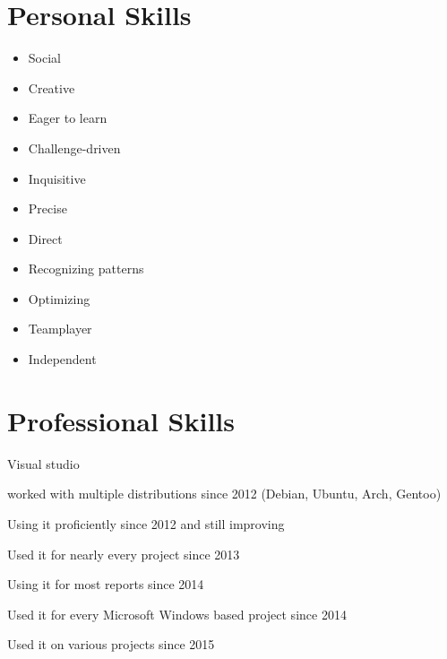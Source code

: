 \documentclass[]{friggeri-cv} %
\begin{document}

\section{Personal Skills}

\begin{multicols}{2}
   \begin{itemize}
      \item Social
      \item Creative
      \item Eager to learn
      \item Challenge-driven
      \item Inquisitive
      \item Precise
      \item Direct
      \item Recognizing patterns
      \item Optimizing
      \item Teamplayer
      \item Independent
   \end{itemize}
\end{multicols}


\section{Professional Skills}

\begin{labeling}{Visual studio}
\item [Linux] worked with multiple distributions since 2012 (Debian, Ubuntu, Arch, Gentoo)
\item [Vim] Using it proficiently since 2012 and still improving
\item [Git] Used it for nearly every project since 2013
\item [\LaTeX] Using it for most reports since 2014
\item [Visual studio] Used it for every Microsoft Windows based project since 2014
\item [CVS] Used it on various projects since 2015
\end{labeling}

\end{document}
